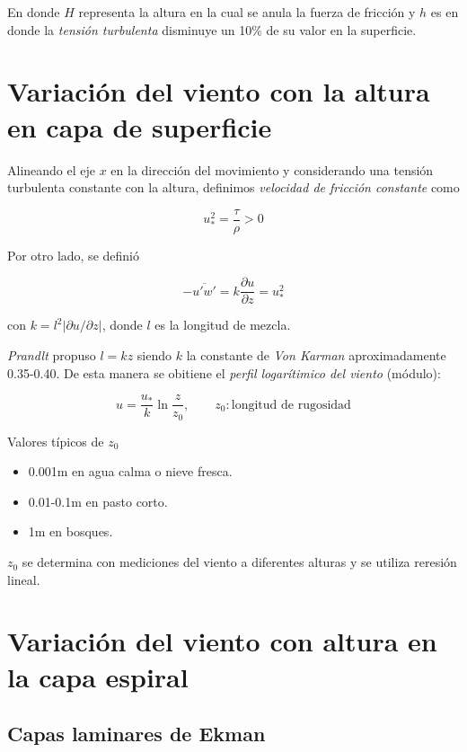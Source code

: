 \documentclass[openany]{book}
\begin{document}
En donde $H$ representa la altura en la cual se anula la fuerza de
fricción y $h$ es en donde la \emph{tensión turbulenta} disminuye un
10\% de su valor en la superficie.

\section{Variación del viento con la altura en capa de superficie}
Alineando el eje $x$ en la dirección del movimiento y considerando una
tensión turbulenta constante con la altura, definimos \emph{velocidad
de fricción constante} como

\begin{equation}
    u_{*}^{2}=\frac{\tau}{\rho}>0
\end{equation}

\par Por otro lado, se definió

\begin{equation}
    -\overline{u'w'}=k \frac{\partial u}{\partial z}=u_{*}^{2}
\end{equation}

con $k=l^{2}\left|\partial u/\partial z\right|$, donde $l$ es la
longitud de mezcla.

\par \emph{Prandlt} propuso $l=kz$ siendo $k$ la constante de \emph{Von
Karman} aproximadamente 0.35-0.40. De esta manera se obitiene el
\emph{perfil logarítimico del viento} (módulo):

\begin{equation}
    u=\frac{u_{*}}{k}\ln{\frac{z}{z_0}},\qquad z_0:\textrm{longitud de rugosidad}
\end{equation}

\par Valores típicos de $z_0$
\begin{itemize}
    \item 0.001m en agua calma o nieve fresca.
    \item 0.01-0.1m en pasto corto.
    \item 1m en bosques.
\end{itemize}
$z_0$ se determina con mediciones del viento a diferentes alturas y se
utiliza reresión lineal.

\section{Variación del viento con altura en la capa espiral}

\subsection{Capas laminares de Ekman}
\end{document}
